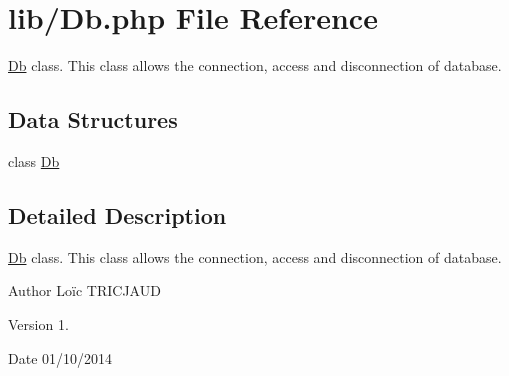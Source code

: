 \hypertarget{_db_8php}{\section{lib/\-Db.php File Reference}
\label{_db_8php}
}


\hyperlink{class_db}{Db} class. This class allows the connection, access and disconnection of database.  


\subsection*{Data Structures}
\begin{DoxyCompactItemize}
\item 
class \hyperlink{class_db}{Db}
\end{DoxyCompactItemize}


\subsection{Detailed Description}
\hyperlink{class_db}{Db} class. This class allows the connection, access and disconnection of database. \begin{DoxyAuthor}{Author}
Loïc T\-R\-I\-C\-J\-A\-U\-D 
\end{DoxyAuthor}
\begin{DoxyVersion}{Version}
1. 
\end{DoxyVersion}
\begin{DoxyDate}{Date}
01/10/2014 
\end{DoxyDate}
